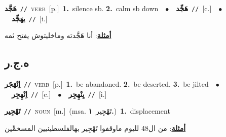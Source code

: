 \documentclass[10pt,a4paper,twoside]{article} %
\begin{document}
\begin{multicols}{2}
{\setlength\topsep{0pt}\textbf{\foreignlanguage{arabic}{هَجَّد}}\ {\color{gray}\texttt{//}\color{black}}\ \textsc{verb}\ [p.]\ \textbf{1.}~silence sb.  \textbf{2.}~calm sb down\ \ $\bullet$\ \ \setlength\topsep{0pt}\textbf{\foreignlanguage{arabic}{هَجِّد}}\ {\color{gray}\texttt{//}\color{black}}\ [c.]\ \ $\bullet$\ \ \setlength\topsep{0pt}\textbf{\foreignlanguage{arabic}{يهَجِّد}}\ {\color{gray}\texttt{//}\color{black}}\ [i.]\  \begin{flushright}\color{gray}\foreignlanguage{arabic}{\textbf{\underline{\foreignlanguage{arabic}{أمثلة}}}: أنا هَجَّدته وماخليتوش يفتح ثمه}\end{flushright}\color{black}} \vspace{2mm}

\vspace{-3mm}
\subsection*{\color{blue}\foreignlanguage{arabic}{ه.ج.ر}\color{blue}{}} 

{\setlength\topsep{0pt}\textbf{\foreignlanguage{arabic}{اِنْهَجَر}}\ {\color{gray}\texttt{//}\color{black}}\ \textsc{verb}\ [p.]\ \textbf{1.}~be abandoned.  \textbf{2.}~be deserted.  \textbf{3.}~be jilted\ \ $\bullet$\ \ \setlength\topsep{0pt}\textbf{\foreignlanguage{arabic}{اِنْهِجِر}}\ {\color{gray}\texttt{//}\color{black}}\ [c.]\ \ $\bullet$\ \ \setlength\topsep{0pt}\textbf{\foreignlanguage{arabic}{يِنْهِجِر}}\ {\color{gray}\texttt{//}\color{black}}\ [i.]\ } \vspace{2mm}

{\setlength\topsep{0pt}\textbf{\foreignlanguage{arabic}{تَهْجِير}}\ {\color{gray}\texttt{//}\color{black}}\ \textsc{noun}\ [m.]\ \color{gray}(msa. \foreignlanguage{arabic}{تَهْجِير}~\foreignlanguage{arabic}{\textbf{١.}})\color{black}\ \textbf{1.}~displacement\  \begin{flushright}\color{gray}\foreignlanguage{arabic}{\textbf{\underline{\foreignlanguage{arabic}{أمثلة}}}: من ال48 لليوم ماوقفوا تَهْجِير بهالفلسطينيين المسخمِّين}\end{flushright}\color{black}} \vspace{2mm}


\end{multicols}
\end{document}
